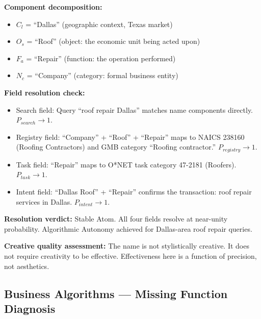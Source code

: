 \documentclass[12pt, openany]{book}
\theoremstyle{thmstyle}
\theoremstyle{defstyle}
\newcommand{\Nc}{N_c}
\newcommand{\Os}{O_s}
\newcommand{\Fa}{F_a}
\newcommand{\Cl}{C_l}
\begin{document}
\begin{examplebox}
\textbf{Component decomposition:}
\begin{itemize}[leftmargin=1.5em]
  \item $\Cl$ = ``Dallas'' (geographic context, Texas market)
  \item $\Os$ = ``Roof'' (object: the economic unit being acted upon)
  \item $\Fa$ = ``Repair'' (function: the operation performed)
  \item $\Nc$ = ``Company'' (category: formal business entity)
\end{itemize}

\textbf{Field resolution check:}
\begin{itemize}[leftmargin=1.5em]
  \item Search field: Query ``roof repair Dallas'' matches name components directly. $P_{search} \to 1$.
  \item Registry field: ``Company'' + ``Roof'' + ``Repair'' maps to NAICS 238160 (Roofing Contractors) and GMB category ``Roofing contractor.'' $P_{registry} \to 1$.
  \item Task field: ``Repair'' maps to O*NET task category 47-2181 (Roofers). $P_{task} \to 1$.
  \item Intent field: ``Dallas Roof'' + ``Repair'' confirms the transaction: roof repair services in Dallas. $P_{intent} \to 1$.
\end{itemize}

\textbf{Resolution verdict:} Stable Atom. All four fields resolve at near-unity probability. Algorithmic Autonomy achieved for Dallas-area roof repair queries.

\textbf{Creative quality assessment:} The name is not stylistically creative. It does not require creativity to be effective. Effectiveness here is a function of precision, not aesthetics.
\end{examplebox}

\subsection{Business Algorithms --- Missing Function Diagnosis}
\end{document}
